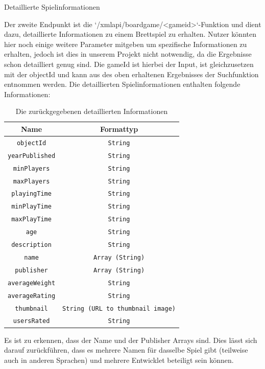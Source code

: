  \large Detaillierte Spielinformationen

Der zweite Endpunkt ist die `/xmlapi/boardgame/<gameid>`-Funktion und dient dazu,
detaillierte Informationen zu einem Brettspiel zu erhalten. Nutzer könnten hier noch einige weitere Parameter mitgeben um spezifische Informationen zu erhalten, jedoch ist dies in unserem Projekt nicht notwendig, da die Ergebnisse schon detailliert genug sind.
Die gameId ist hierbei der Input, ist gleichzusetzen mit der objectId und kann aus des oben erhaltenen Ergebnisses der Suchfunktion entnommen werden.
Die detaillierten Spielinformationen enthalten folgende Informationen:

\begin{table}[H]
    \centering
    \begin{tabular}{|c|c|}
        \hline
        \textbf{Name} & \textbf{Formattyp} \\
        \hline
        \texttt{objectId} & \texttt{String} \\
        \texttt{yearPublished} & \texttt{String} \\
        \texttt{minPlayers} & \texttt{String} \\
        \texttt{maxPlayers} & \texttt{String} \\
        \texttt{playingTime} & \texttt{String} \\
        \texttt{minPlayTime} & \texttt{String} \\
        \texttt{maxPlayTime} & \texttt{String} \\
        \texttt{age} & \texttt{String} \\
        \texttt{description} & \texttt{String} \\
        \texttt{name} & \texttt{Array (String)} \\
        \texttt{publisher} & \texttt{Array (String)} \\
        \texttt{averageWeight} & \texttt{String} \\
        \texttt{averageRating} & \texttt{String} \\
        \texttt{thumbnail} & \texttt{String (URL to thumbnail image)} \\
        \texttt{usersRated} & \texttt{String} \\
        \hline
    \end{tabular}
    \caption{Die zurückgegebenen detaillierten Informationen}
    \label{tab:boardgame_properties}
\end{table}

Es ist zu erkennen, dass der Name und der Publisher Arrays sind. Dies lässt sich darauf zurückführen, dass es mehrere Namen für dasselbe Spiel gibt (teilweise auch in anderen Sprachen) und mehrere Entwicklet beteiligt sein können.

